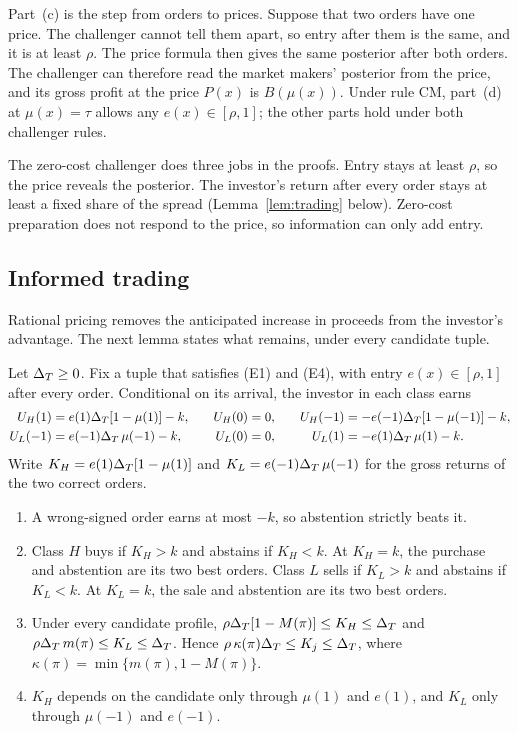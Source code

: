 Part~(c) is the step from orders to prices. Suppose that two orders have one price. The challenger cannot tell them
apart, so entry after them is the same, and it is at least \(\rho\). The price formula then gives the same posterior
after both orders. The challenger can therefore read the market makers' posterior from the price, and its gross
profit at the price \(P(x)\) is \(B(\mu(x))\). Under rule CM, part~(d) at \(\mu(x)=\tau\) allows any
\(e(x)\in[\rho,1]\); the other parts hold under both challenger rules.

The zero-cost challenger does three jobs in the proofs. Entry stays at least \(\rho\), so the price reveals the
posterior. The investor's return after every order stays at least a fixed share of the spread
(Lemma~\ref{lem:trading} below). Zero-cost preparation does not respond to the price, so information can only add
entry.

\subsection{Informed trading}\label{sec:informed}

Rational pricing removes the anticipated increase in proceeds from the investor's advantage. The next lemma states
what remains, under every candidate tuple.

\begin{lemma}\label{lem:trading}
Let \(\Delta_T\ge0\). Fix a tuple that satisfies (E1) and (E4), with entry \(e(x)\in[\rho,1]\) after every order.
Conditional on its arrival, the investor in each class earns
\[
\begin{aligned}
U_H(1)&=e(1)\Delta_T[1-\mu(1)]-k,&\quad U_H(0)&=0,&\quad U_H(-1)&=-e(-1)\Delta_T[1-\mu(-1)]-k,\\
U_L(-1)&=e(-1)\Delta_T\,\mu(-1)-k,&\quad U_L(0)&=0,&\quad U_L(1)&=-e(1)\Delta_T\,\mu(1)-k.
\end{aligned}
\]
Write \(K_H=e(1)\Delta_T[1-\mu(1)]\) and \(K_L=e(-1)\Delta_T\,\mu(-1)\) for the gross returns of the two correct orders.
\begin{enumerate}[label=(\alph*),leftmargin=2em]
\item A wrong-signed order earns at most \(-k\), so abstention strictly beats it.
\item Class \(H\) buys if \(K_H>k\) and abstains if \(K_H<k\). At \(K_H=k\), the purchase and abstention are its
two best orders. Class \(L\) sells if \(K_L>k\) and abstains if \(K_L<k\). At \(K_L=k\), the sale and abstention
are its two best orders.
\item Under every candidate profile, \(\rho\Delta_T[1-M(\pi)]\le K_H\le\Delta_T\) and \(\rho\Delta_T\,m(\pi)\le K_L\le\Delta_T\).
Hence \(\rho\,\kappa(\pi)\Delta_T\le K_j\le\Delta_T\), where \(\kappa(\pi)=\min\{m(\pi),1-M(\pi)\}\).
\item \(K_H\) depends on the candidate only through \(\mu(1)\) and \(e(1)\), and \(K_L\) only through
\(\mu(-1)\) and \(e(-1)\).
\end{enumerate}
\end{lemma}

